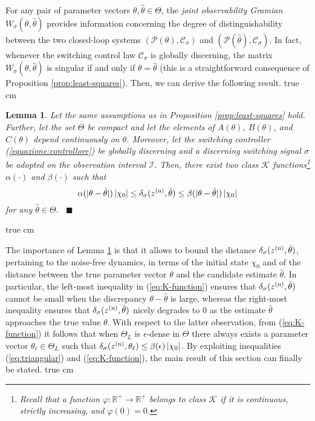 \documentclass[letterpaper, 10 pt, conference]{ieeetran}
\def\qedp{\hspace*{\fill}~{\tiny $\blacksquare$}}
\def\salt{\vskip 0.2 true cm}
\newtheorem{itlemma}{Lemma}
\newenvironment{lemma}{\begin{itlemma}\rm}{\end{itlemma}}
\begin{document}
For any pair of parameter vectors $\theta,\hat \theta \in \Theta$, the {\em joint observability Gramian} $W_\sigma(\theta,\hat \theta)$ provides information concerning
the degree of distinguishability between the two closed-loop systems $(\mathcal P(\theta), \mathcal C_\sigma )$ and $(\mathcal P(\hat \theta), \mathcal C_\sigma)$. In fact,
whenever the switching control law $\mathcal C_\sigma$ is globally discerning, the matrix $W_\sigma(\theta,\hat \theta)$ is singular if and only if $\theta = \hat \theta$
(this is a straightforward consequence of Proposition \ref{prop:least-squares}). Then,
we can derive the following result. \salt

\begin{lemma}\label{lemma:K-function}
Let the same assumptions as in Proposition \ref{prop:least-squares} hold. Further, let the set $\Theta$ be compact and let the elements of $A(\theta)$, $B(\theta)$, and $C(\theta)$ depend continuously on $\theta$. 
Moreover, let the switching controller (\ref{equazione:controllore}) be globally discerning and
a discerning switching signal $\sigma$ be adopted on the observation interval $\mathcal I$. Then, there exist two class $\mathcal K$ functions\footnote{Recall
that a function $\varphi: \mathbb R^+ \rightarrow \mathbb R^+$ belongs to class $\mathcal K$ if it is continuous, strictly increasing, and $\varphi(0) = 0$.} $\alpha (\cdot)$ 
and $\beta (\cdot)$ such that
\begin{equation} \label{eq:K-function}
\alpha(|\theta-\hat \theta|) \, | \chi_0 | \le {\delta_{\sigma}(z^{({\rm n})} ,{\hat \theta})} \le \beta(|\theta-\hat \theta|) \, | \chi_0 |
\end{equation}
for any $\hat \theta \in \Theta$.
\qedp
\end{lemma}\salt

The importance of Lemma \ref{lemma:K-function} is that it allows to bound the distance ${\delta_{\sigma}(z^{({\rm n})} ,{\hat \theta})}$, pertaining to the noise-free dynamics,
in terms of the initial state $\chi_0$ and of the distance between the true parameter vector $\theta$ and the candidate estimate $\hat \theta$. In particular, the left-most inequality in
(\ref{eq:K-function}) ensures that ${\delta_{\sigma}(z^{({\rm n})} ,{\hat \theta})}$ cannot be small when the discrepancy $\theta-\hat \theta$ is large, whereas the right-most inequality
ensures that ${\delta_{\sigma}(z^{({\rm n})} ,{\hat \theta})}$ nicely degrades to $0$ as the estimate $\hat \theta$ approaches the true value $\theta$. With respect to the latter observation,
from (\ref{eq:K-function}) it follows that when  $\Theta_L$ is $\epsilon$-dense in $\Theta$ there always exists a parameter vector $\theta_\ell \in \Theta_L$ such that
${\delta_{\sigma}(z^{({\rm n})} ,{\theta_\ell})} \le \beta(\epsilon) \, | \chi_0 |$. By exploiting inequalities (\ref{eq:triangular}) and (\ref{eq:K-function}), the main result of this section can finally be stated.
\salt
\end{document}
